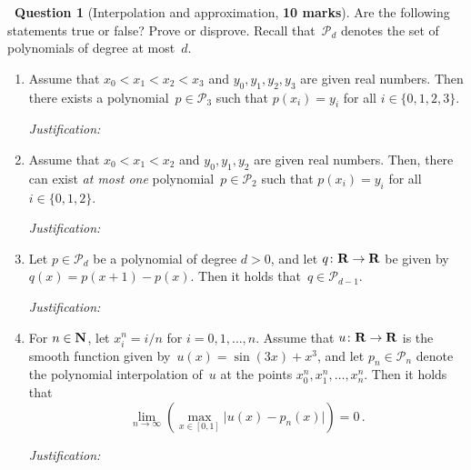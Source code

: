 \documentclass[10pt]{article}
\theoremstyle{definition}
\newtheorem{question}{{\normalfont \faGears}~Question}
\renewcommand{\mymarks}[1]{\textbf{#1 marks}}
\begin{document}
\newpage
\begin{question}
    [Interpolation and approximation, \mymarks{10}]
    Are the following statements true or false? Prove or disprove.
    Recall that~$\mathcal P_d$ denotes the set of polynomials of degree at most~$d$.

    \begin{enumerate}
        \item
            Assume that $x_0 < x_1 < x_2 < x_3$ and $y_0, y_1, y_2, y_3$ are given real numbers. 
            Then there exists a polynomial~$p \in \mathcal P_3$ such that
            \(
                p(x_i) = y_i 
            \)
            for all $i \in \{0, 1, 2, 3\}$.

            \textit{Justification:}
            \vspace{3cm}

        \item
            Assume that $x_0 < x_1 < x_2$ and $y_0, y_1, y_2$ are given real numbers. 
            Then, there can exist \emph{at most one} polynomial~$p \in \mathcal P_2$ such that
            \(
                p(x_i) = y_i 
            \)
            for all $i \in \{0, 1, 2\}$.

            \textit{Justification:}
            \vspace{3cm}

        \item
            Let $p \in \mathcal P_d$ be a polynomial of degree $d > 0$,
            and let $q\colon \mathbf R \to \mathbf R$ be given by $q(x) = p(x+1) - p(x)$.
            Then it holds that~$q \in \mathcal P_{d-1}$.

            \textit{Justification:}
            \vspace{3cm}

        \item
            For $n \in \mathbf N$, let $x^n_i = i/n$ for $i = 0, 1, \dotsc, n$.
            Assume that $u \colon \mathbf R \to \mathbf R$ is the smooth function given by~$u(x) = \sin(3x) + x^3$,
            and let $p_n \in \mathcal P_n$ denote the polynomial interpolation of~$u$ at the points $x^n_0, x^n_1, \dotsc, x^n_n$.
            Then it holds that
            \[
                \lim_{n \to \infty} \left( \max_{x \in [0, 1]} \bigl\lvert u(x) - p_n(x) \bigr\rvert \right) = 0 \, .
            \]

            \textit{Justification:}
            \vspace{3cm}
    \end{enumerate}
\end{question}
\end{document}
